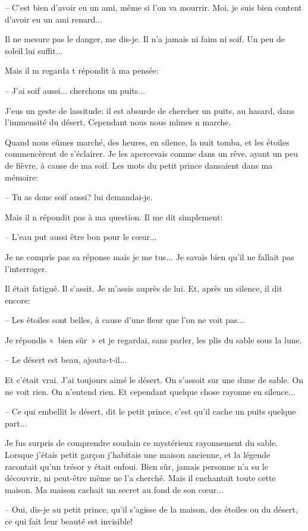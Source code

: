 \documentclass[a4paper]{report}
\begin{document}
-- C'est bien d'avoir eu un ami, même si l'on va mourrir. Moi, je suis bien content d'avoir eu un ami renard...

Il ne mesure pas le danger, me dis-je. Il n'a jamais ni faim ni soif. Un peu de soleil lui suffit...

Mais il m regarda t répondit à ma pensée:

-- J'ai soif aussi... cherchons un puits...

J'eus un geste de lassitude: il est absurde de chercher un puits, au hasard, dans l'immensité du désert. Cependant nous nous mîmes n marche.

Quand nous eûmes marché, des heures, en silence, la nuit tomba, et les étoiles commencèrent de s'éclairer. Je les apercevais comme dans un rêve, ayant un peu de fièvre, à cause de ma soif. Les mots du petit prince dansaient dans ma mémoire:

-- Tu as donc soif aussi? lui demandai-je.

Mais il n répondit pas à ma question. Il me dit simplement:

-- L'eau put aussi être bon pour le cœur...

Je ne compris pas sa réponse mais je me tus... Je savais bien qu'il ne fallait pas l'interroger.

Il était fatigué. Il s'assit. Je m'assis auprès de lui. Et, après un silence, il dit encore:

-- Les étoiles sont belles, à cause d'une fleur que l'on ne voit pas...

Je répondis «~bien sûr~» et je regardai, sans parler, les plis du sable sous la lune.

-- Le désert est beau, ajouta-t-il...

Et c'était vrai. J'ai toujours aimé le désert. On s'assoit sur une dune de sable. On ne voit rien. On n'entend rien. Et cependant quelque chose rayonne en silence...

-- Ce qui embellit le désert, dit le petit prince, c'est qu'il cache un puits quelque part...

Je fus surpris de comprendre soudain ce mystérieux rayonnement du sable. Lorsque j'étais petit garçon j'habitais une maison ancienne, et la légende racontait qu'un trésor y était enfoui. Bien sûr, jamais personne n'a su le découvrir, ni peut-être même ne l'a cherché. Mais il enchantait toute cette maison. Ma maison cachait un secret au fond de son cœur...

-- Oui, dis-je au petit prince, qu'il s'agisse de la maison, des étoiles ou du désert, ce qui fait leur beauté est invisible!
\end{document}
